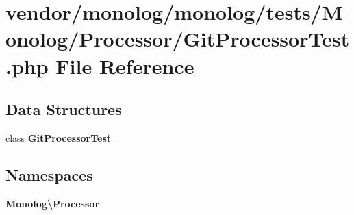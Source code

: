 \section{vendor/monolog/monolog/tests/\+Monolog/\+Processor/\+Git\+Processor\+Test.php File Reference}
\label{_git_processor_test_8php}
\subsection*{Data Structures}
\begin{DoxyCompactItemize}
\item 
class {\bf Git\+Processor\+Test}
\end{DoxyCompactItemize}
\subsection*{Namespaces}
\begin{DoxyCompactItemize}
\item 
 {\bf Monolog\textbackslash{}\+Processor}
\end{DoxyCompactItemize}
